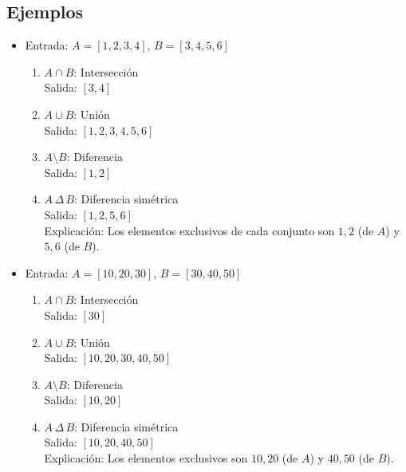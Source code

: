 \begin{enumerate}
    \subsection*{Ejemplos}
    \begin{itemize}
        \item Entrada: \( A = [1, 2, 3, 4] \), \( B = [3, 4, 5, 6] \)
        \begin{enumerate}
            \item \( A \cap B \): Intersección\\
            Salida: \([3, 4]\)
    
            \item \( A \cup B \): Unión\\
            Salida: \([1, 2, 3, 4, 5, 6]\)
    
            \item \( A \setminus B \): Diferencia\\
            Salida: \([1, 2]\)
    
            \item \( A \, \Delta \, B \): Diferencia simétrica\\
            Salida: \([1, 2, 5, 6]\)\\
            Explicación: Los elementos exclusivos de cada conjunto son \(1, 2\) (de \(A\)) y \(5, 6\) (de \(B\)).
        \end{enumerate}
    
        \item Entrada: \( A = [10, 20, 30] \), \( B = [30, 40, 50] \)
        \begin{enumerate}
            \item \( A \cap B \): Intersección\\
            Salida: \([30]\)
    
            \item \( A \cup B \): Unión\\
            Salida: \([10, 20, 30, 40, 50]\)
    
            \item \( A \setminus B \): Diferencia\\
            Salida: \([10, 20]\)
    
            \item \( A \, \Delta \, B \): Diferencia simétrica\\
            Salida: \([10, 20, 40, 50]\)\\
            Explicación: Los elementos exclusivos son \(10, 20\) (de \(A\)) y \(40, 50\) (de \(B\)).
        \end{enumerate}
    

\end{itemize}
\end{enumerate}
